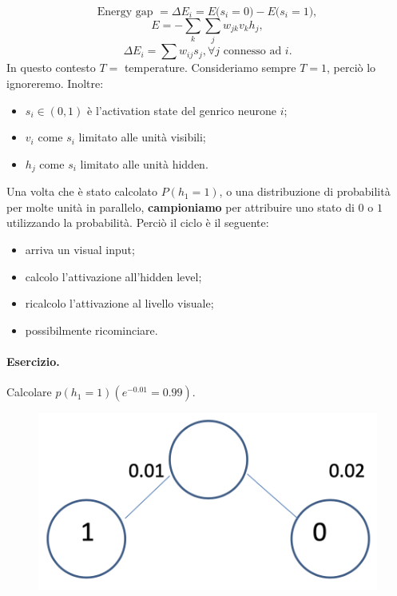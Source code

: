 \begin{equation}
    \text{Energy gap }=\Delta E_i = E\big( s_i=0 \big)-E\big( s_i=1 \big),
\end{equation}
\begin{equation}
    E = -\sum_k\sum_jw_{jk}v_kh_j,
\end{equation}
\begin{equation}
   \Delta E_i=\sum w_{ij}s_j, \forall j \text{ connesso ad } i.
\end{equation}
In questo contesto $T=$ temperature. Consideriamo sempre $T=1$, perciò lo ignoreremo.
Inoltre:
\begin{itemize}
    \item $s_i\in(0,1)$ è l'activation state del genrico neurone $i$;
    \item $v_i$ come $s_i$ limitato alle unità visibili;
    \item $h_j$ come $s_i$ limitato alle unità hidden.
\end{itemize}
Una volta che è stato calcolato $P(h_1=1)$, o una distribuzione di probabilità per molte unità in parallelo, \textbf{campioniamo}  per attribuire uno stato di $0$ o $1$ utilizzando la probabilità.
\newline
\newline
Perciò il ciclo è il seguente:
\begin{itemize}
    \item arriva un visual input;
    \item calcolo l'attivazione all'hidden level;
    \item ricalcolo l'attivazione al livello visuale;
    \item possibilmente ricominciare.
\end{itemize}
\newpage
\paragraph{Esercizio.} Calcolare $p(h_1=1)(e^{-0.01}=0.99)$.
\begin{figure}[!h]
    \includegraphics[scale=.4]{images/rbm/ex01.png}
    \centering
\end{figure}


